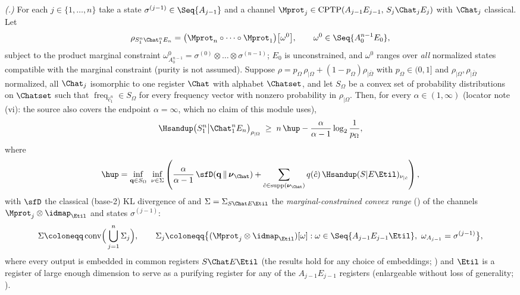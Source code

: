 \begin{fact}\label{fact:meat}
\emph{(\cite[Thm.~4.2a, Eqs.~(100)--(101)]{arqand2025meat}.)}
For each $j\in\{1,\dots,n\}$ take a state
$\sigma^{(j-1)}\in\Seq{A_{j-1}}$ and a channel
$\Mprot_j\in\mathrm{CPTP}(A_{j-1}E_{j-1},\,S_j\Chat_jE_j)$ with
$\Chat_j$ classical. Let
\begin{equation*}
  \rho_{S_1^n\Chat_1^nE_n}
  =\big(\Mprot_n\circ\dots\circ\Mprot_1\big)\big[\omega^{0}\big],
  \qquad
  \omega^{0}\in\Seq{A_0^{n-1}E_0},
\end{equation*}
subject to the product marginal constraint
$\omega^{0}_{A_0^{n-1}}=\sigma^{(0)}\otimes\dots\otimes\sigma^{(n-1)}$;
$E_0$ is unconstrained, and $\omega^{0}$ ranges over \emph{all}
normalized states compatible with the marginal constraint (purity is
not assumed). Suppose
$\rho=p_{\Omega}\,\rho_{|\Omega}+(1-p_{\Omega})\rho_{|\bar\Omega}$
with $p_{\Omega}\in(0,1]$ and $\rho_{|\Omega},\rho_{|\bar\Omega}$
normalized, all $\Chat_j$ isomorphic to one register $\Chat$ with
alphabet $\Chatset$, and let $S_{\Omega}$ be a convex set of
probability distributions on $\Chatset$ such that
$\operatorname{freq}_{\hat c_1^n}\in S_{\Omega}$ for every frequency
vector with nonzero probability in $\rho_{|\Omega}$. Then, for every
$\alpha\in(1,\infty)$ (locator note (vi): the source also covers the
endpoint $\alpha=\infty$, which no claim of this module uses),
\begin{equation}\label{eq:meat}
  \Hsandup\big(S_1^n\big|\Chat_1^nE_n\big)_{\rho_{|\Omega}}
  \;\ge\;n\,\hup-\frac{\alpha}{\alpha-1}\log_2\frac{1}{p_{\Omega}},
\end{equation}
where
\begin{equation}\label{eq:meat-rate}
  \hup=\inf_{\mathbf q\in S_{\Omega}}\ \inf_{\nu\in\Sigma}
  \left(\frac{\alpha}{\alpha-1}\,
  \sfD\!\left(\mathbf q\,\middle\|\,\boldsymbol{\nu}_{\Chat}\right)
  +\sum_{\hat c\in\operatorname{supp}(\boldsymbol{\nu}_{\Chat})}
  q(\hat c)\,\Hsandup(S|E\Etil)_{\nu_{|\hat c}}\right),
\end{equation}
with $\sfD$ the classical (base-2) KL divergence of
 and $\Sigma=\Sigma_{S\Chat E\Etil}$ the
\emph{marginal-constrained convex range}
(\cite[Def.~4.2, Eq.~(98)]{arqand2025meat}) of the channels
$\Mprot_j\otimes\idmap_{\Etil}$ and states $\sigma^{(j-1)}$:
\begin{equation}\label{eq:meat-range}
  \Sigma\coloneqq\operatorname{conv}\!\Big(\bigcup_{j=1}^{n}\Sigma_j\Big),
  \qquad
  \Sigma_j\coloneqq\big\{(\Mprot_j\otimes\idmap_{\Etil})[\omega]:
  \omega\in\Seq{A_{j-1}E_{j-1}\Etil},\
  \omega_{A_{j-1}}=\sigma^{(j-1)}\big\},
\end{equation}
where every output is embedded in common registers $S\Chat E\Etil$ (the
results hold for any choice of embeddings;
\cite[footnote~12]{arqand2025meat}) and $\Etil$ is a register of large
enough dimension to serve as a purifying register for any of the
$A_{j-1}E_{j-1}$ registers (enlargeable without loss of generality;
\cite[footnote~17]{arqand2025meat}).


\end{fact}
